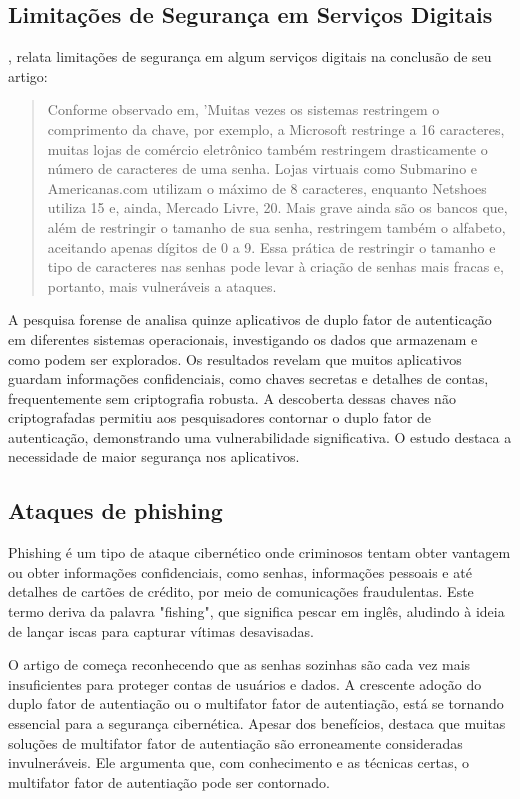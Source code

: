 \documentclass[12pt]{article}
\begin{document}
\subsection{Limitações de Segurança em Serviços Digitais}

\cite{article:1}, relata limitações de segurança em algum serviços
digitais na conclusão de seu artigo:
\begin{quote}
  Conforme observado em, 'Muitas vezes os sistemas restringem o comprimento da chave, por exemplo, a
  Microsoft restringe a 16 caracteres, muitas lojas de comércio eletrônico também restringem drasticamente o
  número de caracteres de uma senha. Lojas virtuais como Submarino e Americanas.com utilizam o máximo de 8
  caracteres, enquanto Netshoes utiliza 15 e, ainda, Mercado Livre, 20. Mais grave ainda são os bancos que,
  além de restringir o tamanho de sua senha, restringem também o alfabeto, aceitando apenas dígitos de 0 a 9.
  Essa prática de restringir o tamanho e tipo de caracteres nas senhas pode levar à criação de senhas mais
  fracas e, portanto, mais vulneráveis a ataques. \cite{article:1}
\end{quote}

A pesquisa forense de \cite{article:2} analisa quinze aplicativos de duplo fator de
autenticação em diferentes sistemas operacionais, investigando os dados que armazenam
e como podem ser explorados.
Os resultados revelam que muitos aplicativos guardam informações confidenciais, como
chaves secretas e detalhes de contas, frequentemente sem criptografia robusta.
A descoberta dessas chaves não criptografadas permitiu aos pesquisadores contornar o 
duplo fator de autenticação, demonstrando uma vulnerabilidade significativa.
O estudo destaca a necessidade de maior segurança nos aplicativos.

\subsection{Ataques de phishing}

Phishing é um tipo de ataque cibernético onde criminosos tentam obter
vantagem ou obter informações confidenciais, como senhas, informações
pessoais e até detalhes de cartões de crédito, por meio de comunicações
fraudulentas.
Este termo deriva da palavra "fishing", que significa pescar em inglês,
aludindo à ideia de lançar iscas para capturar vítimas desavisadas.

O artigo de \cite{article:3} começa reconhecendo que as senhas sozinhas são cada vez mais
insuficientes para proteger contas de usuários e dados.
A crescente adoção do duplo fator de autentiação ou o multifator fator de autentiação, está
se tornando essencial para a segurança cibernética.
Apesar dos benefícios, \cite{article:3} destaca que muitas soluções de multifator fator de
autentiação são erroneamente consideradas invulneráveis.
Ele argumenta que, com conhecimento e as técnicas certas, o multifator fator de autentiação
pode ser contornado.
\end{document}
